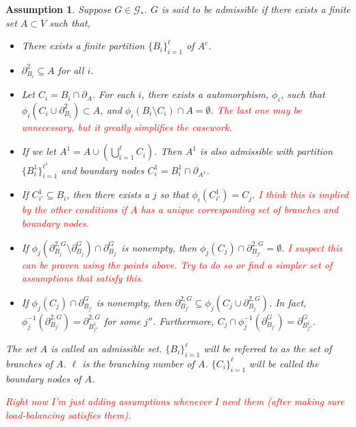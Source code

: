 \documentclass[12pt]{article}
\newcommand{\mc}{\mathcal}
\newcommand{\tr}{\textcolor{red}}
\newcommand{\ind}{\hspace{24pt}}
\newcommand{\neigh}[1]{\partial_{#1}}				%
\newcommand{\dneigh}[1]{\partial^2_{#1}}			%
\newcommand{\gneigh}[2]{\partial^{#1}_{#2}}			%
\newcommand{\dgneigh}[2]{\partial^{2,#1}_{#2}}		%
\newcommand{\indx}[1]{^{#1}}						%
\newcommand{\psize}{\ell}							%
\newcommand{\Gs}{\mc{G}_\ast}						%
\newtheorem{assu}{Assumption}
\begin{document}
\begin{assu}
Suppose \(G \in \Gs\). \(G\) is said to be admissible if there exists a finite set \(A \subset V\) such that,

\begin{itemize}
\item There exists a finite partition \(\{B_i\}_{i=1}^\psize\) of \(A^c\).

\item \(\dneigh{B_i} \subseteq A\) for all \(i\).

\item Let \(C_i = B_i\cap\neigh{A}\). For each \(i\), there exists a automorphism, \(\phi_i\), such that \(\phi_i(C_i\cup \dneigh{B_i}) \subset A\), and \(\phi_i(B_i\setminus C_i)\cap A = \emptyset\). \tr{The last one may be unnecessary, but it greatly simplifies the casework.}

\item If we let \(A\indx{1} = A\cup \left(\bigcup_{i=1}^\psize C_i\right)\). Then \(A\indx{1}\) is also admissible with partition \(\{B\indx{1}_i\}_{i=1}^{\psize\indx{1}}\) and boundary nodes \(C\indx{1}_i = B\indx{1}_i\cap \neigh{A\indx{1}}\).

\item If \(C\indx{1}_{i'} \subseteq B_i\), then there exists a \(j\) so that \(\phi_i(C\indx{1}_{i'}) = C_j\). \tr{I think this is implied by the other conditions if \(A\) has a unique corresponding set of branches and boundary nodes.}

\item If \(\phi_j(\dgneigh{G}{B_j}\setminus\gneigh{G}{B_j})\cap\gneigh{G}{B_{j'}}\) is nonempty, then \(\phi_j(C_j)\cap\dgneigh{G}{B_{j'}} = \emptyset\). \tr{I suspect this can be proven using the points above. Try to do so or find a simpler set of assumptions that satisfy this.}

\item If \(\phi_j(C_j) \cap \gneigh{G}{B_{j'}}\) is nonempty, then \(\dgneigh{G}{B_{j'}} \subseteq \phi_j(C_j\cup\dgneigh{G}{B_j})\). In fact, \(\phi_j^{-1}(\dgneigh{G}{B_{j'}}) = \dgneigh{G}{B_{j''}\indx{1}}\) for some \(j''\). Furthermore, \(C_j\cap\phi_j^{-1}(\gneigh{G}{B_{j'}}) = \gneigh{G}{B_{j''}\indx{1}}\).
\end{itemize}

The set \(A\) is called an admissible set. \(\{B_i\}_{i=1}^\psize\) will be referred to as the set of branches of \(A\). \(\psize\) is the branching number of \(A\). \(\{C_i\}_{i=1}^\psize\) will be called the boundary nodes of \(A\).

\ind \tr{Right now I'm just adding assumptions whenever I need them (after making sure load-balancing satisfies them).}
\label{a::admissible}
\end{assu}
\end{document}
